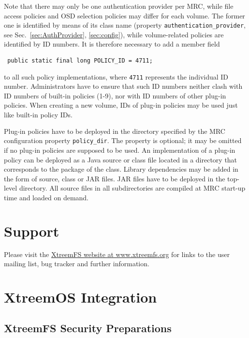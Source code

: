 \documentclass[a4paper,10pt]{book}
\begin{document}
Note that there may only be one authentication provider per MRC, while file access policies and OSD selection policies may differ for each volume. The former one is identified by means of its class name (property \texttt{authentication\_provider}, see Sec.\ \ref{sec:AuthProvider}, \ref{sec:config}), while volume-related policies are identified by ID numbers. It is therefore necessary to add a member field

\begin{verbatim}
 public static final long POLICY_ID = 4711;
\end{verbatim}

to all such policy implementations, where \texttt{4711} represents the individual ID number. Administrators have to ensure that such ID numbers neither clash with ID numbers of built-in policies (1-9), nor with ID numbers of other plug-in policies. When creating a new volume, IDs of plug-in policies may be used just like built-in policy IDs.

Plug-in policies have to be deployed in the directory specified by the MRC configuration property \texttt{policy\_dir}. The property is optional; it may be omitted if no plug-in policies are supposed to be used. An implementation of a plug-in policy can be deployed as a Java source or class file located in a directory that corresponds to the package of the class. Library dependencies may be added in the form of source, class or JAR files. JAR files have to be deployed in the top-level directory. All source files in all subdirectories are compiled at MRC start-up time and loaded on demand.

\appendix

\chapter{Support}
Please visit the \href{http://www.xtreemfs.org}{XtreemFS website at www.xtreemfs.org} for links to the user mailing list, bug tracker and further information.

\chapter{XtreemOS Integration}

\section{XtreemFS Security Preparations}
\label{installconf-xfs-security}
\end{document}
